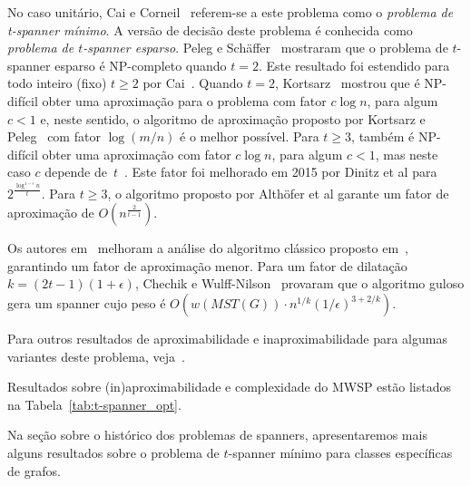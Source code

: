 No caso unitário, Cai e Corneil~\cite{CaiC1995} referem-se a este problema como o \emph{problema de t-spanner mínimo}. A versão de decisão deste problema é conhecida como \emph{problema de $t$-spanner esparso}.  Peleg e Schäffer~\cite{PelegS1989} mostraram que o problema de $t$-spanner esparso é NP-completo quando $t=2$.  Este resultado foi estendido para todo inteiro (fixo) $t\geq 2$ por Cai~\cite{Cai1994}.
Quando $t = 2$, Kortsarz~\cite{Kortsarz2001} mostrou que é NP-difícil obter uma aproximação para o problema com fator $c\log{n}$, para algum $c < 1$ e, neste sentido, o algoritmo de aproximação proposto por Kortsarz e Peleg~\cite{KortsarzP1994} com fator $\log(m / n)$ é o melhor possível. Para $t \ge 3$, também é NP-difícil obter uma aproximação com fator $c \log{n}$, para algum $c < 1$, mas neste caso $c$ depende de~$t$~\cite{Kortsarz2001}.  Este fator foi melhorado em 2015 por Dinitz et al \cite{DinitzKR2015} para $2^\frac{\log^{1-\epsilon} n}{t}$.  Para $t \ge 3$, o algoritmo proposto por Alth\"{o}fer et al \cite{AlthoferDDJS1993} garante um fator de aproximação de $O(n^{\frac{2}{t-1}})$.

Os autores em~\cite{ElkinNS2015,ChechikWN2016} melhoram a análise do algoritmo clássico proposto em~\cite{ChandraDNS1992,AlthoferDDJS1993}, garantindo um fator de aproximação menor. Para um fator de dilatação $k = (2t - 1)(1 + \epsilon)$, Chechik e Wulff-Nilson~\cite{ChechikWN2016} provaram que o algoritmo guloso gera um spanner cujo peso é $O(w(MST(G)) \cdot n^{1/k}(1/\epsilon)^{3 + 2/k})$.

Para outros resultados de aproximabilidade e inaproximabilidade para algumas variantes deste problema, veja~\cite{ElkinP2005,ElkinP2007}.

Resultados sobre (in)aproximabilidade e complexidade do MWSP estão listados na Tabela~\ref{tab:t-spanner_opt}.

Na seção sobre o histórico dos problemas de spanners, apresentaremos mais alguns resultados sobre o problema de $t$-spanner mínimo para classes específicas de grafos.

